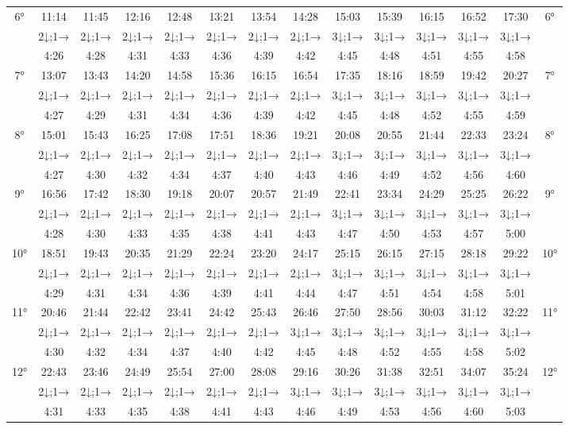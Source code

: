\begin{scriptsize}
\begin{tabular}{c || c | c | c | c | c | c | c | c | c | c | c | c || c}
		\multirow{3}{*}{6°}&11:14&11:45&12:16&12:48&13:21&13:54&14:28&15:03&15:39&16:15&16:52&17:30&\multirow{3}{*}{6°}\\ \space&2↓;1→&2↓;1→&2↓;1→&2↓;1→&2↓;1→&2↓;1→&2↓;1→&3↓;1→&3↓;1→&3↓;1→&3↓;1→&3↓;1→&\space\\&4:26&4:28&4:31&4:33&4:36&4:39&4:42&4:45&4:48&4:51&4:55&4:58&\space\\\hline
		\multirow{3}{*}{7°}&13:07&13:43&14:20&14:58&15:36&16:15&16:54&17:35&18:16&18:59&19:42&20:27&\multirow{3}{*}{7°}\\ \space&2↓;1→&2↓;1→&2↓;1→&2↓;1→&2↓;1→&2↓;1→&2↓;1→&3↓;1→&3↓;1→&3↓;1→&3↓;1→&3↓;1→&\space\\&4:27&4:29&4:31&4:34&4:36&4:39&4:42&4:45&4:48&4:52&4:55&4:59&\space\\\hline
		\multirow{3}{*}{8°}&15:01&15:43&16:25&17:08&17:51&18:36&19:21&20:08&20:55&21:44&22:33&23:24&\multirow{3}{*}{8°}\\ \space&2↓;1→&2↓;1→&2↓;1→&2↓;1→&2↓;1→&2↓;1→&2↓;1→&3↓;1→&3↓;1→&3↓;1→&3↓;1→&3↓;1→&\space\\&4:27&4:30&4:32&4:34&4:37&4:40&4:43&4:46&4:49&4:52&4:56&4:60&\space\\\hline
		\multirow{3}{*}{9°}&16:56&17:42&18:30&19:18&20:07&20:57&21:49&22:41&23:34&24:29&25:25&26:22&\multirow{3}{*}{9°}\\ \space&2↓;1→&2↓;1→&2↓;1→&2↓;1→&2↓;1→&2↓;1→&2↓;1→&3↓;1→&3↓;1→&3↓;1→&3↓;1→&3↓;1→&\space\\&4:28&4:30&4:33&4:35&4:38&4:41&4:43&4:47&4:50&4:53&4:57&5:00&\space\\\hline
		\multirow{3}{*}{10°}&18:51&19:43&20:35&21:29&22:24&23:20&24:17&25:15&26:15&27:15&28:18&29:22&\multirow{3}{*}{10°}\\ \space&2↓;1→&2↓;1→&2↓;1→&2↓;1→&2↓;1→&2↓;1→&2↓;1→&3↓;1→&3↓;1→&3↓;1→&3↓;1→&3↓;1→&\space\\&4:29&4:31&4:34&4:36&4:39&4:41&4:44&4:47&4:51&4:54&4:58&5:01&\space\\\hline
		\multirow{3}{*}{11°}&20:46&21:44&22:42&23:41&24:42&25:43&26:46&27:50&28:56&30:03&31:12&32:22&\multirow{3}{*}{11°}\\ \space&2↓;1→&2↓;1→&2↓;1→&2↓;1→&2↓;1→&2↓;1→&3↓;1→&3↓;1→&3↓;1→&3↓;1→&3↓;1→&3↓;1→&\space\\&4:30&4:32&4:34&4:37&4:40&4:42&4:45&4:48&4:52&4:55&4:58&5:02&\space\\\hline
		\multirow{3}{*}{12°}&22:43&23:46&24:49&25:54&27:00&28:08&29:16&30:26&31:38&32:51&34:07&35:24&\multirow{3}{*}{12°}\\ \space&2↓;1→&2↓;1→&2↓;1→&2↓;1→&2↓;1→&2↓;1→&3↓;1→&3↓;1→&3↓;1→&3↓;1→&3↓;1→&3↓;1→&\space\\&4:31&4:33&4:35&4:38&4:41&4:43&4:46&4:49&4:53&4:56&4:60&5:03&\space\\\hline

\end{tabular}
\end{scriptsize}
